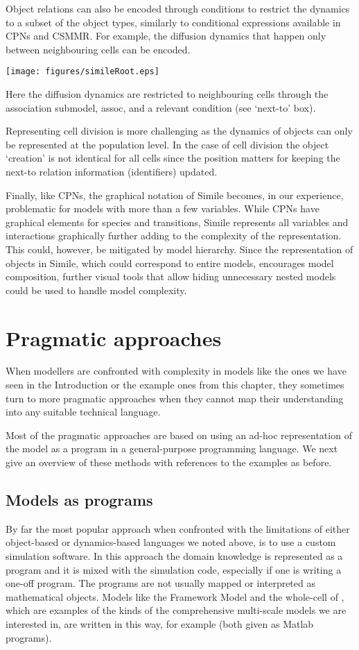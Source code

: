 Object relations can also be encoded through conditions to restrict the dynamics
to a subset of the object types, similarly to conditional expressions available
in CPNs and CSMMR. For example, the diffusion dynamics that happen only between
neighbouring cells can be encoded.
\begin{center}
  \texttt{[image: figures/simileRoot.eps]}
\end{center}
Here the diffusion dynamics are restricted to neighbouring cells through the
association submodel, assoc, and a relevant condition (see `next-to' box).

Representing cell division is more challenging as the dynamics of objects can
only be represented at the population level. In the case of cell division the object
`creation' is not identical for all cells since the position matters for keeping
the next-to relation information (identifiers) updated.

Finally, like CPNs, the graphical notation of Simile becomes, in our experience,
problematic for models with more than a few variables. While CPNs have graphical
elements for species and transitions, Simile represents all variables and
interactions graphically further adding to the complexity of the
representation. This could, however, be mitigated by model hierarchy. Since the
representation of objects in Simile, which could correspond to entire models,
encourages model composition, further visual tools that allow hiding unnecessary
nested models could be used to handle model complexity.

\section{Pragmatic approaches}
\label{sec:pragmaticApproaches}
When modellers are confronted with complexity in models like the ones we have
seen in the Introduction or the example ones from this chapter, they sometimes
turn to more pragmatic approaches when they cannot map their understanding into
any suitable technical language.

Most of the pragmatic approaches are based on using an ad-hoc representation of
the model as a program in a general-purpose programming language. We next give
an overview of these methods with references to the examples as before.


\subsection{Models as programs}
By far the most popular approach when confronted with the limitations of either
object-based or dynamics-based languages we noted above, is to use a custom
simulation software. In this approach the domain knowledge is represented as a
program and it is mixed with the simulation code, especially if one is writing a
one-off program. The programs are not usually mapped or interpreted as
mathematical objects. Models like the Framework Model \citep{chew2014multiscale}
and the whole-cell of \citet{karr_whole-cell_2012}, which are examples of the
kinds of the comprehensive multi-scale models we are interested in, are written
in this way, for example (both given as Matlab programs).

